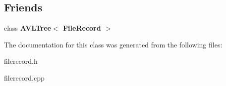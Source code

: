 \subsection*{Friends}
\begin{DoxyCompactItemize}
\item 
\hypertarget{classFileRecord_a03d4730545f33c2c00fc022661486fe9}{class {\bfseries A\-V\-L\-Tree$<$ File\-Record $>$}}\label{classFileRecord_a03d4730545f33c2c00fc022661486fe9}

\end{DoxyCompactItemize}


The documentation for this class was generated from the following files\-:\begin{DoxyCompactItemize}
\item 
filerecord.\-h\item 
filerecord.\-cpp\end{DoxyCompactItemize}
